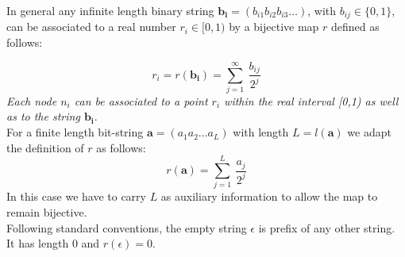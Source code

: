 \documentclass[11pt,a4paper,twoside,openright]{book}
\begin{document}
In general any infinite length binary string $\mathbf{b_{i}}=(b_{i1}b_{i2}b_{i3}\ldots)$, with $b_{ij} \in \{0,1\}$, can be associated to a real number $r_{i} \in [0,1)$ by a bijective map $r$ defined as follows:

\begin{equation}
r_{i}=r(\mathbf{b_{i}})=\sum_{j=1}^{\infty} \ \frac{b_{ij}}{2^{j}}
\end{equation}
\emph{Each node $n_{i}$ can be associated to a point $r_{i}$ within the real interval [0,1) as well as to the string $\mathbf{b_{i}}$}.\\
For a finite length bit-string $\mathbf{a}=(a_{1}a_{2}\ldots a_{L})$ with length $L=l(\mathbf{a})$ we adapt the definition of $r$ as follows:
\begin{equation}
r(\mathbf{a})=\sum_{j=1}^{L} \ \frac{a_{j}}{2^{j}}
\end{equation}
In this case we have to carry $L$ as auxiliary information to allow the map to remain bijective.\\
Following standard conventions, the empty string $\epsilon$ is prefix of any other string. It has length 0 and $r(\epsilon)=0$.

\end{document}
